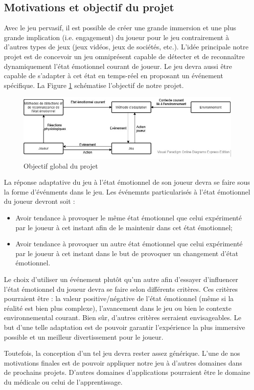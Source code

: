 \documentclass{article}
\begin{document}
	\subsection{Motivations et objectif du projet}\label{sec:objectif}
		Avec le jeu pervasif, il est possible de créer une grande immersion et une plus grande implication (i.e. engagement) du joueur pour le jeu contrairement à d'autres types de jeux (jeux vidéos, jeux de sociétés, etc.).
		L'idée principale notre projet est de concevoir un jeu omniprésent capable de détecter et de reconnaître dynamiquement l'état émotionnel courant de joueur. 
		Le jeu devra aussi être capable de s'adapter à cet état en temps-réel en proposant un événement spécifique. 
		La Figure \ref{fig:motivation} schématise l'objectif de notre projet.
		\begin{figure}
			\centering
			\includegraphics[scale=0.75]{../include/motivation.jpg}
			\caption{Objectif global du projet}
			\label{fig:motivation}
		\end{figure}\par
		La réponse adaptative du jeu à l'état émotionnel de son joueur devra se faire sous la forme d'événments dans le jeu.
		Les événemnts particularisés à l'état émotionnel du joueur devront soit :
		\begin{itemize}
			\item Avoir tendance à provoquer le même état émotionnel que celui expérimenté par le joueur à cet instant afin de le maintenir dans cet état émotionnel;
			\item Avoir tendance à provoquer un autre état émotionnel que celui expérimenté par le joueur à cet instant dans le but de provoquer un changement d'état émotionnel.
		\end{itemize}
		Le choix d'utiliser un événement plutôt qu'un autre afin d'essayer d'influencer l'état émotionnel du joueur devra se faire selon différents critères.
		Ces critères pourraient être : la valeur positive/négative de l'état émotionnel (même si la réalité est bien plus complexe), l'avancement dans le jeu ou bien le contexte environnemental courant.
		Bien sûr, d'autres critères serraient envisageables.
		Le but d'une telle adaptation est de pouvoir garantir l'expérience la plus immersive possible et un meilleur divertissement pour le joueur.\par
		Toutefois, la conception d'un tel jeu devra rester assez générique.
		L'une de nos motivations finales est de pouvoir appliquer notre jeu à d'autres domaines dans de prochains projets.
		D'autres domaines d'applications pourraient être le domaine du médicale ou celui de l'apprentissage.
\end{document}

